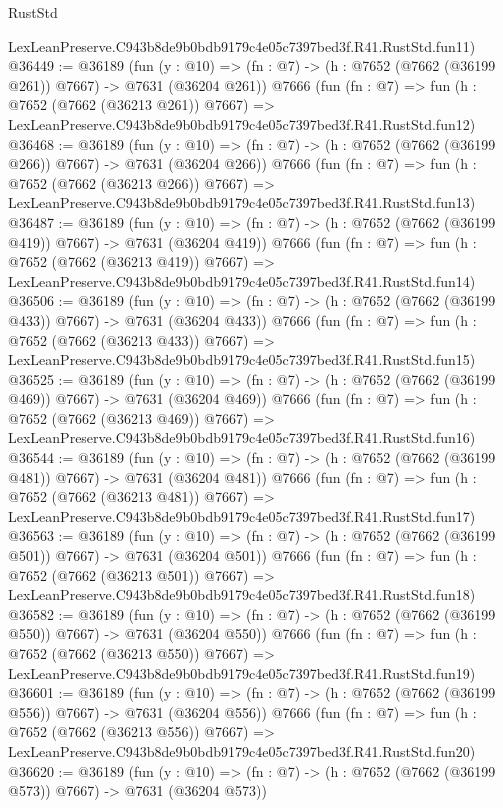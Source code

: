 \begin{lexlean}{RustStd}
\begin{coremodule}
    LexLeanPreserve.C943b8de9b0bdb9179c4e05c7397bed3f.R41.RustStd.fun11)
@36449 := @36189
    (fun (y : @10) => (fn : @7) -> (h : @7652 (@7662 (@36199 @261)) @7667) -> @7631 (@36204 @261))
    @7666
    (fun (fn : @7) =>
    fun (h : @7652 (@7662 (@36213 @261)) @7667) =>
    LexLeanPreserve.C943b8de9b0bdb9179c4e05c7397bed3f.R41.RustStd.fun12)
@36468 := @36189
    (fun (y : @10) => (fn : @7) -> (h : @7652 (@7662 (@36199 @266)) @7667) -> @7631 (@36204 @266))
    @7666
    (fun (fn : @7) =>
    fun (h : @7652 (@7662 (@36213 @266)) @7667) =>
    LexLeanPreserve.C943b8de9b0bdb9179c4e05c7397bed3f.R41.RustStd.fun13)
@36487 := @36189
    (fun (y : @10) => (fn : @7) -> (h : @7652 (@7662 (@36199 @419)) @7667) -> @7631 (@36204 @419))
    @7666
    (fun (fn : @7) =>
    fun (h : @7652 (@7662 (@36213 @419)) @7667) =>
    LexLeanPreserve.C943b8de9b0bdb9179c4e05c7397bed3f.R41.RustStd.fun14)
@36506 := @36189
    (fun (y : @10) => (fn : @7) -> (h : @7652 (@7662 (@36199 @433)) @7667) -> @7631 (@36204 @433))
    @7666
    (fun (fn : @7) =>
    fun (h : @7652 (@7662 (@36213 @433)) @7667) =>
    LexLeanPreserve.C943b8de9b0bdb9179c4e05c7397bed3f.R41.RustStd.fun15)
@36525 := @36189
    (fun (y : @10) => (fn : @7) -> (h : @7652 (@7662 (@36199 @469)) @7667) -> @7631 (@36204 @469))
    @7666
    (fun (fn : @7) =>
    fun (h : @7652 (@7662 (@36213 @469)) @7667) =>
    LexLeanPreserve.C943b8de9b0bdb9179c4e05c7397bed3f.R41.RustStd.fun16)
@36544 := @36189
    (fun (y : @10) => (fn : @7) -> (h : @7652 (@7662 (@36199 @481)) @7667) -> @7631 (@36204 @481))
    @7666
    (fun (fn : @7) =>
    fun (h : @7652 (@7662 (@36213 @481)) @7667) =>
    LexLeanPreserve.C943b8de9b0bdb9179c4e05c7397bed3f.R41.RustStd.fun17)
@36563 := @36189
    (fun (y : @10) => (fn : @7) -> (h : @7652 (@7662 (@36199 @501)) @7667) -> @7631 (@36204 @501))
    @7666
    (fun (fn : @7) =>
    fun (h : @7652 (@7662 (@36213 @501)) @7667) =>
    LexLeanPreserve.C943b8de9b0bdb9179c4e05c7397bed3f.R41.RustStd.fun18)
@36582 := @36189
    (fun (y : @10) => (fn : @7) -> (h : @7652 (@7662 (@36199 @550)) @7667) -> @7631 (@36204 @550))
    @7666
    (fun (fn : @7) =>
    fun (h : @7652 (@7662 (@36213 @550)) @7667) =>
    LexLeanPreserve.C943b8de9b0bdb9179c4e05c7397bed3f.R41.RustStd.fun19)
@36601 := @36189
    (fun (y : @10) => (fn : @7) -> (h : @7652 (@7662 (@36199 @556)) @7667) -> @7631 (@36204 @556))
    @7666
    (fun (fn : @7) =>
    fun (h : @7652 (@7662 (@36213 @556)) @7667) =>
    LexLeanPreserve.C943b8de9b0bdb9179c4e05c7397bed3f.R41.RustStd.fun20)
@36620 := @36189
    (fun (y : @10) => (fn : @7) -> (h : @7652 (@7662 (@36199 @573)) @7667) -> @7631 (@36204 @573))

\end{coremodule}
\end{lexlean}
